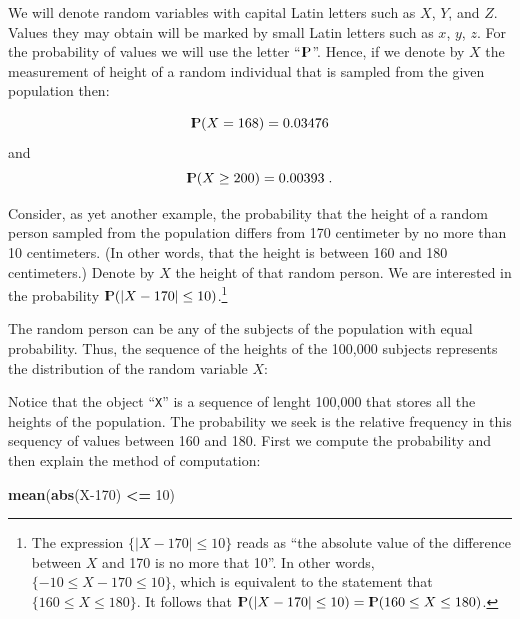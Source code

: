 \documentclass[]{krantz}
\makeatletter
\newenvironment{Shaded}{\begin{snugshade}}{\end{snugshade}}
\newcommand{\DataTypeTok}[1]{\textcolor[rgb]{0.13,0.29,0.53}{#1}}
\newcommand{\DecValTok}[1]{\textcolor[rgb]{0.00,0.00,0.81}{#1}}
\newcommand{\FloatTok}[1]{\textcolor[rgb]{0.00,0.00,0.81}{#1}}
\newcommand{\KeywordTok}[1]{\textcolor[rgb]{0.13,0.29,0.53}{\textbf{#1}}}
\newcommand{\NormalTok}[1]{#1}
\newcommand{\OperatorTok}[1]{\textcolor[rgb]{0.81,0.36,0.00}{\textbf{#1}}}
\newcommand{\StringTok}[1]{\textcolor[rgb]{0.31,0.60,0.02}{#1}}
\newcommand{\Prob}{{\rm I\kern-.3em P}}
\newenvironment{kframe}{%
\medskip{}
\setlength{\fboxsep}{.8em}
 \def\at@end@of@kframe{}%
 \ifinner\ifhmode%
  \def\at@end@of@kframe{\end{minipage}}%
  \begin{minipage}{\columnwidth}%
 \fi\fi%
 \def\FrameCommand##1{\hskip\@totalleftmargin \hskip-\fboxsep
 \colorbox{shadecolor}{##1}\hskip-\fboxsep
     \hskip-\linewidth \hskip-\@totalleftmargin \hskip\columnwidth}%
 \MakeFramed {\advance\hsize-\width
   \@totalleftmargin\z@ \linewidth\hsize
   \@setminipage}}%
 {\par\unskip\endMakeFramed%
 \at@end@of@kframe}
\renewenvironment{Shaded}{\begin{kframe}}{\end{kframe}}
\theoremstyle{definition}
\theoremstyle{definition}
\theoremstyle{definition}
\theoremstyle{remark}
\makeatother
\begin{document}
We will denote random variables with capital Latin letters such as \(X\),
\(Y\), and \(Z\). Values they may obtain will be marked by small Latin
letters such as \(x\), \(y\), \(z\). For the probability of values we will use
the letter ``\(\Prob\)''. Hence, if we denote by \(X\) the measurement of
height of a random individual that is sampled from the given population
then:

\[\Prob(X = 168) = 0.03476\] and
\[\Prob(X \geq 200) = 0.00393\;.\]

Consider, as yet another example, the probability that the height of a
random person sampled from the population differs from 170 centimeter by
no more than 10 centimeters. (In other words, that the height is between
160 and 180 centimeters.) Denote by \(X\) the height of that random
person. We are interested in the probability
\(\Prob(|X -170| \leq 10)\).\footnote{The expression \(\{|X -170| \leq 10\}\) reads as ``the absolute value
  of the difference between \(X\) and 170 is no more that 10''. In other
  words, \(\{-10 \leq X - 170 \leq 10\}\), which is equivalent to the
  statement that \(\{160 \leq X \leq 180\}\). It follows that
  \(\Prob(|X-170|\leq 10) = \Prob(160\leq X \leq 180)\).}

The random person can be any of the subjects of the population with
equal probability. Thus, the sequence of the heights of the 100,000
subjects represents the distribution of the random variable \(X\):

\begin{Shaded}
\end{Shaded}

Notice that the object ``\texttt{X}'' is a sequence of lenght 100,000 that stores
all the heights of the population. The probability we seek is the
relative frequency in this sequency of values between 160 and 180. First
we compute the probability and then explain the method of computation:

\begin{Shaded}
\begin{Highlighting}[]
\KeywordTok{mean}\NormalTok{(}\KeywordTok{abs}\NormalTok{(X}\DecValTok{-170}\NormalTok{) }\OperatorTok{<=}\StringTok{ }\DecValTok{10}\NormalTok{)}
\end{Highlighting}
\end{Shaded}
\end{document}
